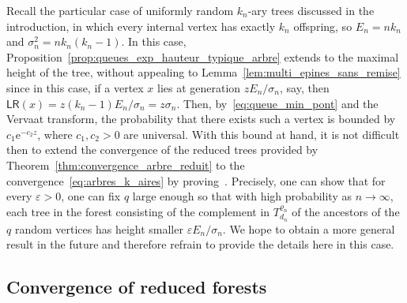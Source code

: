 \documentclass[AHL,Unicode,longabstracts,published]{cedram}
\newcommand{\1}{\ensembles{1}}
\newcommand{\LR}{\mathsf{LR}}
\newcommand{\e}{\mathrm{e}}
\newcommand{\fn}{T_{d_n}^{\varrho_n}}
\newcommand{\edges}{E}
\begin{document}
\begin{rema}\label{rem:k_ary}
Recall the particular case of uniformly random $k_{n}$-ary trees discussed in the introduction, in which every internal vertex has exactly $k_{n}$ offspring, so $\edges_{n} = n k_{n}$ and $\sigma_{n}^{2} = n k_{n} (k_{n}-1)$. In this case, Proposition~\ref{prop:queues_exp_hauteur_typique_arbre} extends to the maximal height of the tree, without appealing to Lemma~\ref{lem:multi_epines_sans_remise} since in this case, if a vertex $x$ lies at generation $z \edges_{n}/\sigma_{n}$, say, then $\LR(x) = z (k_{n}-1) \edges_{n}/\sigma_{n} = z \sigma_{n}$. Then, by~\eqref{eq:queue_min_pont} and the Vervaat transform, the probability that there exists such a vertex is bounded by $c_1 \e^{- c_2 z}$, where $c_{1}, c_{2} > 0$ are universal. With this bound at hand, it is not difficult then to extend the convergence of the reduced trees provided by Theorem~\ref{thm:convergence_arbre_reduit} to the convergence~\eqref{eq:arbres_k_aires} by proving~\cite[Equation~25]{Ald93}. Precisely, one can show that for every $\varepsilon>0$, one can fix $q$ large enough so that with high probability as $n\to\infty$, each tree in the forest consisting of the complement in $\fn$ of the ancestors of the $q$ random vertices has height smaller $\varepsilon \edges_n/\sigma_n$. We hope to obtain a more general result in the future and therefore refrain to provide the details here in this case.
\end{rema}



\subsection{Convergence of reduced forests}\label{sec:marginales_hauteur}
\end{document}
